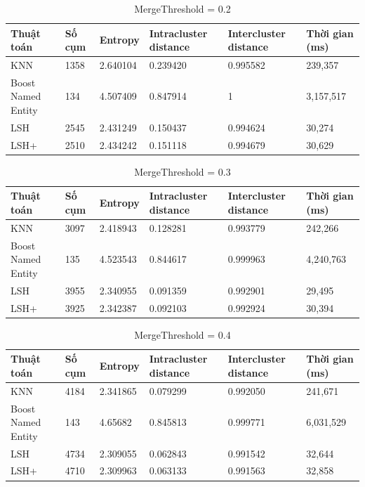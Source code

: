 		\begin{table}[H]
			\setlength\extrarowheight{3pt}
			\begin{tabular}{|l|p{1.4cm}|p{1.5cm}|p{2cm}|p{2cm}|p{1.8cm}|}
				\hline
				Thuật toán  & Số cụm   & Entropy & Intracluster distance & Intercluster distance & Thời gian (ms) \\
				\hline
				KNN   & 1358  & 2.640104 & 0.239420 & 0.995582 & 239,357 \\
				\hline
				Boost Named Entity & 134 & 4.507409 & 0.847914 & 1 & 3,157,517 \\
				\hline
				LSH   & 2545  & 2.431249 & 0.150437 & 0.994624 & 30,274 \\
				\hline
				LSH+  & 2510  & 2.434242 & 0.151118 & 0.994679 & 30,629 \\
				\hline
			\end{tabular}%
			\caption{MergeThreshold = 0.2} \label{tab:table_4_2}%
		\end{table}
		
		\begin{table}[H]
			\centering
			\setlength\extrarowheight{3pt}
			\begin{tabular}{|l|p{1.4cm}|p{1.5cm}|p{2cm}|p{2cm}|p{1.8cm}|}
				\hline
				Thuật toán  & Số cụm   & Entropy & Intracluster distance & Intercluster distance & Thời gian (ms) \\
				\hline
				KNN   & 3097  & 2.418943 & 0.128281 & 0.993779 & 242,266 \\
				\hline
				Boost Named Entity & 135  & 4.523543 & 0.844617 & 0.999963 & 4,240,763 \\
				\hline
				LSH   & 3955  & 2.340955 & 0.091359 & 0.992901 & 29,495 \\
				\hline
				LSH+  & 3925  & 2.342387 & 0.092103 & 0.992924 & 30,394 \\
				\hline		
			\end{tabular}%
			\caption{MergeThreshold = 0.3} \label{tab:table_4_3}%
		\end{table}
		
		\begin{table}[H]
			\centering
			\setlength\extrarowheight{3pt}
			\begin{tabular}{|l|p{1.4cm}|p{1.5cm}|p{2cm}|p{2cm}|p{1.8cm}|}
				\hline
				Thuật toán  & Số cụm   & Entropy & Intracluster distance & Intercluster distance & Thời gian (ms) \\
				\hline
				KNN   & 4184  & 2.341865 & 0.079299 & 0.992050 & 241,671 \\
				\hline
				Boost Named Entity & 143 & 4.65682 & 0.845813 & 0.999771 & 6,031,529 \\
				\hline
				LSH   & 4734  & 2.309055 & 0.062843 & 0.991542 & 32,644 \\
				\hline
				LSH+  & 4710  & 2.309963 & 0.063133 & 0.991563 & 32,858 \\
				\hline
			\end{tabular}%
			\caption{MergeThreshold = 0.4} \label{tab:table_4_4}%
		\end{table}
		
